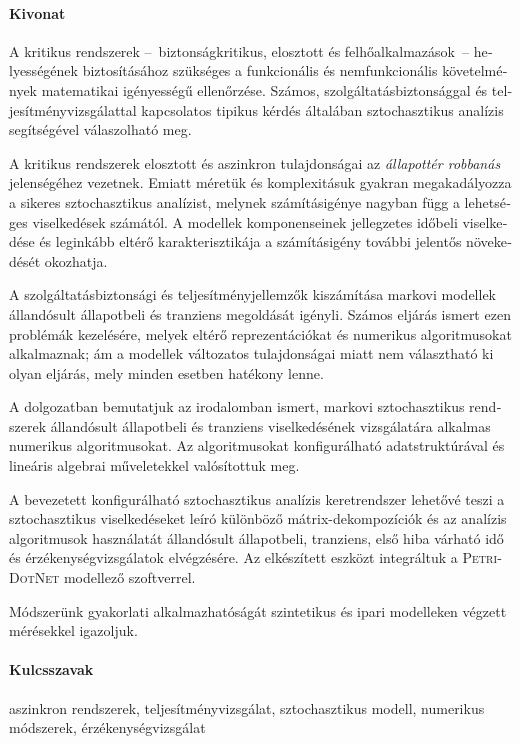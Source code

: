 \begin{otherlanguage}{magyar}

  \paragraph*{Kivonat}
  \thispagestyle{plain}

  A kritikus rendszerek --~biztonságkritikus,
  elosztott és felhőalkalmazások~-- helyességének
  biztosításához szükséges a funkcionális és nemfunkcionális
  követelmények matematikai igényességű ellenőrzése. Számos,
  szolgáltatásbiztonsággal és teljesítményvizsgálattal kapcsolatos
  tipikus kérdés általában sztochasztikus analízis segítségével
  válaszolható meg.

  A kritikus rendszerek elosztott és aszinkron tulajdonságai az
  \emph{állapottér robbanás} jelenségéhez vezetnek. Emiatt méretük és
  komplexitásuk gyakran megakadályozza a sikeres sztochasztikus
  analízist, melynek számításigénye nagyban függ a lehetséges
  viselkedések számától. A modellek komponenseinek jellegzetes időbeli
  viselkedése és leginkább eltérő karakterisztikája a számításigény
  további jelentős növekedését okozhatja.

  A szolgáltatásbiztonsági és teljesítményjellemzők kiszámítása
  markovi modellek állandósult állapotbeli és tranziens megoldását
  igényli. Számos eljárás ismert ezen problémák kezelésére, melyek
  eltérő reprezentációkat és numerikus algoritmusokat alkalmaznak; ám
  a modellek változatos tulajdonságai miatt nem választható ki olyan
  eljárás, mely minden esetben hatékony lenne.

  A dolgozatban bemutatjuk az irodalomban ismert, markovi
  sztochasztikus rendszerek állandósult állapotbeli és tranziens
  viselkedésének vizsgálatára alkalmas numerikus algoritmusokat. Az
  algoritmusokat konfigurálható adatstruktúrával és lineáris algebrai
  műveletekkel valósítottuk meg.

  A bevezetett konfigurálható sztochasztikus analízis keretrendszer
  lehetővé teszi a sztochasztikus viselkedéseket leíró különböző
  mátrix-dekompozíciók és az analízis algoritmusok használatát
  állandósult állapotbeli, tranziens, első hiba várható idő és
  érzékenységvizsgálatok elvégzésére. Az elkészített eszközt
  integráltuk a \textsc{PetriDotNet} modellező szoftverrel.

  Módszerünk gyakorlati alkalmazhatóságát szintetikus és ipari
  modelleken végzett mérésekkel igazoljuk.

  \paragraph{Kulcsszavak} aszinkron rendszerek, teljesítményvizsgálat,
  sztochasztikus modell, numerikus módszerek, érzékenységvizsgálat
\end{otherlanguage}

